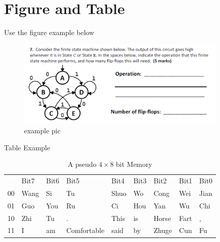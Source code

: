 \documentclass[12pt,a4paper]{article} %
\theoremstyle{definition}
\theoremstyle{remark}
\begin{document}
\section{Figure and Table}
Use the figure example below
\begin{figure}[htbp!]
	\centering
	\includegraphics[width=0.9\textwidth]{FSM_1.png}
	\caption{example pic}
\end{figure}
\vspace{5mm}

Table Example
\begin{table}[htbp!]
	\centering
	\label{my-label}
	\begin{tabular}{lllllllll}
		& Bit7                      & Bit6                     & Bit5                             & Bit4                      & Bit3                     & Bit2                       & Bit1                      & Bit0                      \\ \cline{2-9} 
		\multicolumn{1}{l|}{00} & \multicolumn{1}{l|}{Wang} & \multicolumn{1}{l|}{Si}  & \multicolumn{1}{l|}{Tu}          & \multicolumn{1}{l|}{Shuo} & \multicolumn{1}{l|}{Wo}  & \multicolumn{1}{l|}{Cong}  & \multicolumn{1}{l|}{Wei}  & \multicolumn{1}{l|}{Jian} \\ \cline{2-9} 
		\multicolumn{1}{l|}{01} & \multicolumn{1}{l|}{Guo}  & \multicolumn{1}{l|}{You} & \multicolumn{1}{l|}{Ru}          & \multicolumn{1}{l|}{Ci}   & \multicolumn{1}{l|}{Hou} & \multicolumn{1}{l|}{Yan}   & \multicolumn{1}{l|}{Wu}   & \multicolumn{1}{l|}{Chi}  \\ \cline{2-9} 
		\multicolumn{1}{l|}{10} & \multicolumn{1}{l|}{Zhi}  & \multicolumn{1}{l|}{Tu}  & \multicolumn{1}{l|}{.}           & \multicolumn{1}{l|}{This} & \multicolumn{1}{l|}{is}  & \multicolumn{1}{l|}{Horse} & \multicolumn{1}{l|}{Fart} & \multicolumn{1}{l|}{,}    \\ \cline{2-9} 
		\multicolumn{1}{l|}{11} & \multicolumn{1}{l|}{I}    & \multicolumn{1}{l|}{am}  & \multicolumn{1}{l|}{Comfortable} & \multicolumn{1}{l|}{said} & \multicolumn{1}{l|}{by}  & \multicolumn{1}{l|}{Zhuge} & \multicolumn{1}{l|}{Cun}  & \multicolumn{1}{l|}{Fu}   \\ \cline{2-9} 
	\end{tabular}
	\caption{A pseudo $4\times 8$ bit Memory}
\end{table}

    
%    
%    
\end{document}
